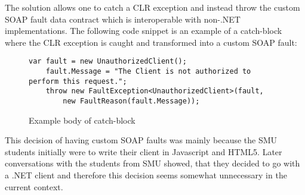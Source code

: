 \documentclass[../report.tex]{subfiles}
\begin{document}
The solution allows one to catch a CLR exception and instead throw the custom SOAP fault data contract which is interoperable with non-.NET implementations. The following code snippet is an example of a catch-block where the CLR exception is caught and transformed into a custom SOAP fault:


\begin{figure}[H]
\begin{lstlisting}[frame=single]
    var fault = new UnauthorizedClient();
    fault.Message = "The Client is not authorized to perform this request.";
    throw new FaultException<UnauthorizedClient>(fault, 
        new FaultReason(fault.Message));
\end{lstlisting}
\caption{Example body of catch-block}
\end{figure}

This decision of having custom SOAP faults was mainly because the SMU students initially were to write their client in Javascript and HTML5. Later conversations with the students from SMU showed, that they decided to go with a .NET client and therefore this decision seems somewhat unnecessary in the current context. 
\end{document}
